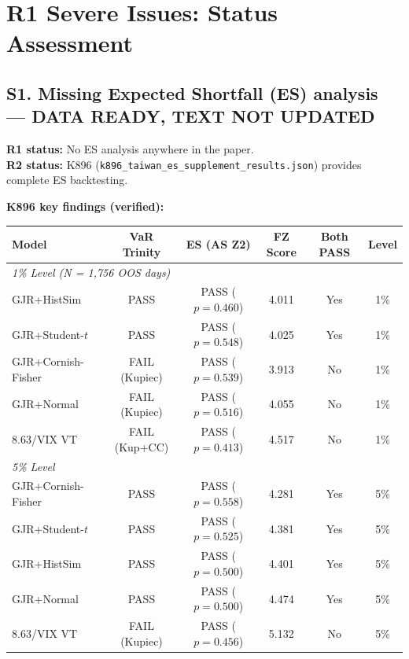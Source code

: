 \documentclass[12pt,a4paper]{article}
\begin{document}
\section*{R1 Severe Issues: Status Assessment}

\subsection*{\textcolor{fixedblue}{S1. Missing Expected Shortfall (ES) analysis --- DATA READY, TEXT NOT UPDATED}}

\textbf{R1 status:} No ES analysis anywhere in the paper.\\
\textbf{R2 status:} K896 (\texttt{k896\_taiwan\_es\_supplement\_results.json}) provides complete ES backtesting.

\medskip
\noindent\textbf{K896 key findings (verified):}

\begin{center}
\small
\begin{tabular}{lccccc}
\toprule
Model & VaR Trinity & ES (AS Z2) & FZ Score & Both PASS & Level \\
\midrule
\multicolumn{6}{l}{\textit{1\% Level (N = 1,756 OOS days)}} \\
GJR+HistSim & PASS & PASS ($p = 0.460$) & 4.011 & \textcolor{okgreen}{Yes} & 1\% \\
GJR+Student-$t$ & PASS & PASS ($p = 0.548$) & 4.025 & \textcolor{okgreen}{Yes} & 1\% \\
GJR+Cornish-Fisher & FAIL (Kupiec) & PASS ($p = 0.539$) & 3.913 & No & 1\% \\
GJR+Normal & FAIL (Kupiec) & PASS ($p = 0.516$) & 4.055 & No & 1\% \\
8.63/VIX VT & FAIL (Kup+CC) & PASS ($p = 0.413$) & 4.517 & No & 1\% \\
\midrule
\multicolumn{6}{l}{\textit{5\% Level}} \\
GJR+Cornish-Fisher & PASS & PASS ($p = 0.558$) & 4.281 & \textcolor{okgreen}{Yes} & 5\% \\
GJR+Student-$t$ & PASS & PASS ($p = 0.525$) & 4.381 & \textcolor{okgreen}{Yes} & 5\% \\
GJR+HistSim & PASS & PASS ($p = 0.500$) & 4.401 & \textcolor{okgreen}{Yes} & 5\% \\
GJR+Normal & PASS & PASS ($p = 0.500$) & 4.474 & \textcolor{okgreen}{Yes} & 5\% \\
8.63/VIX VT & FAIL (Kupiec) & PASS ($p = 0.456$) & 5.132 & No & 5\% \\
\bottomrule
\end{tabular}
\end{center}
\end{document}

